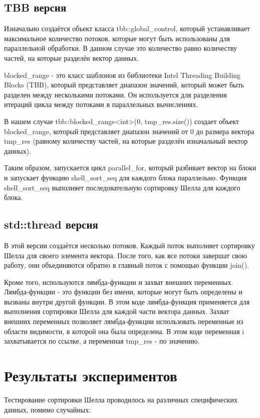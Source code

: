 \documentclass{article}
\begin{document}
\subsection{TBB версия}
Изначально создаётся объект класса tbb::global\_control, который устанавливает максимальное количество потоков, которые могут быть использованы для параллельной обработки. В данном случае это количество равно количеству частей, на которые разделён вектор данных.

blocked\_range - это класс шаблонов из библиотеки Intel Threading Building Blocks (TBB), который представляет диапазон значений, который может быть разделен между несколькими потоками. Он используется для разделения итераций цикла между потоками в параллельных вычислениях.

В нашем случае tbb::blocked\_range<int>(0, tmp\_res.size()) создает объект blocked\_range, который представляет диапазон значений от 0 до размера вектора tmp\_res (равному количеству частей, на которые разделён изначальный вектор данных).

Таким образом, запускается цикл parallel\_for, который разбивает вектор на блоки и запускает функцию shell\_sort\_seq для каждого блока параллельно. Функция shell\_sort\_seq выполняет последовательную сортировку Шелла для каждого блока.

\subsection{std::thread версия}
В этой версии создаётся несколько потоков. Каждый поток выполняет сортировку Шелла для своего элемента вектора. После того, как все потоки завершат свою работу, они объединяются обратно в главный поток с помощью функции join().

Кроме того, используются лямбда-функции и захват внешних переменных. Лямбда-функции - это функции без имени, которые могут быть определены и вызваны внутри другой функции. В этом коде лямбда-функция применяется для выполнения сортировки Шелла для каждой части вектора данных. Захват внешних переменных позволяет лямбда-функции использовать переменные из области видимости, в которой она была определена. В этом коде переменная i захватывается по ссылке, а переменная tmp\_res - по значению.

\newpage
\section{Результаты экспериментов}
Тестирование сортировки Шелла проводилось на различных специфических данных, помимо случайных:
\end{document}
